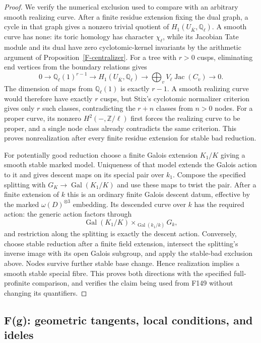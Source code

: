 \begin{proof}
We verify the numerical exclusion used to compare with an
arbitrary smooth realizing curve. After a finite residue extension
fixing the dual graph, a cycle in that graph gives a nonzero
trivial quotient of $H_1(U_{\overline K},\mathbb Q_\ell)$.
A smooth curve has none: its toric homology has character
$\chi_\ell$, while its Jacobian Tate module and its dual have
zero cyclotomic-kernel invariants by the arithmetic argument of
Proposition~\ref{F-centralizer}. For a tree with $r>0$ cusps,
eliminating end vertices from the boundary relations gives
\[
 0\to\mathbb Q_\ell(1)^{r-1}\to H_1(U_{\overline K},\mathbb Q_\ell)
 \to\bigoplus_v V_\ell\operatorname{Jac}(C_v)\to0.
\]
The dimension of maps from $\mathbb Q_\ell(1)$ is exactly $r-1$.
A smooth realizing curve would therefore have exactly $r$ cusps,
but Stix's cyclotomic normalizer criterion gives only $r$ such
classes, contradicting the $r+n$ classes from $n>0$ nodes. For
a proper curve, its nonzero $H^2(-,\mathbb Z/\ell)$ first forces
the realizing curve to be proper, and a single node class already
contradicts the same criterion. This proves nonrealization after
every finite residue extension for stable bad reduction.

For potentially good reduction choose a finite Galois extension
$K_1/K$ giving a smooth stable marked model. Uniqueness of that
model extends the Galois action to it and gives descent maps on
its special pair over $k_1$. Compose the specified splitting with
$G_K\to\operatorname{Gal}(K_1/K)$ and use these maps to twist
the pair. After a finite extension of $k$ this is an ordinary
finite Galois descent datum, effective by the marked
$\omega(D)^{\otimes3}$ embedding. Its descended curve over $k$
has the required action: the generic action factors through
\[
 \operatorname{Gal}(K_1/K)
       \times_{\operatorname{Gal}(k_1/k)}G_k,
\]
and restriction along the splitting is exactly the descent action.
Conversely, choose stable reduction after a finite field
extension, intersect the splitting's inverse image with its open
Galois subgroup, and apply the stable-bad exclusion above. Nodes
survive further stable base change. Hence realization implies a
smooth stable special fibre. This proves both directions with the
specified full-profinite comparison, and verifies the claim being
used from F149 without changing its quantifiers.
\end{proof}

\subsection{F(g): geometric tangents, local conditions, and ideles}


